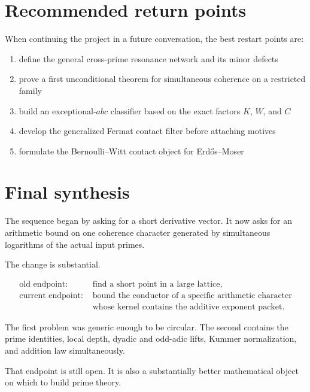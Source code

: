 \section{Recommended return points}
When continuing the project in a future conversation, the best restart points are:
\begin{enumerate}[leftmargin=1.5em]
\item define the general cross-prime resonance network and its minor defects
\item prove a first unconditional theorem for simultaneous coherence on a restricted family
\item build an exceptional-$abc$ classifier based on the exact factors $K$, $W$, and $C$
\item develop the generalized Fermat contact filter before attaching motives
\item formulate the Bernoulli--Witt contact object for Erd\H{o}s--Moser
\end{enumerate}

\section{Final synthesis}
The sequence began by asking for a short derivative vector. It now asks for an arithmetic bound on one coherence character generated by simultaneous logarithms of the actual input primes.

The change is substantial.

\[
\boxed{
\begin{aligned}
\text{old endpoint: }&\text{find a short point in a large lattice},\\
\text{current endpoint: }&\text{bound the conductor of a specific arithmetic character}\\
&\text{whose kernel contains the additive exponent packet}.
\end{aligned}
}
\]

The first problem was generic enough to be circular. The second contains the prime identities, local depth, dyadic and odd-adic lifts, Kummer normalization, and addition law simultaneously.

That endpoint is still open. It is also a substantially better mathematical object on which to build prime theory.
